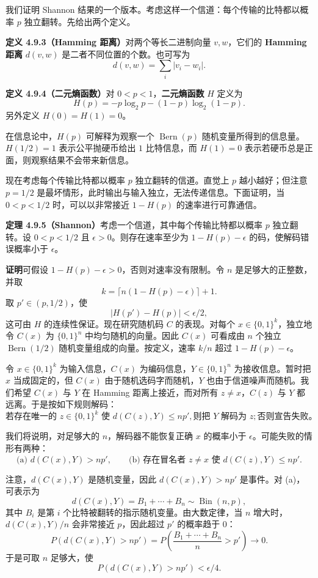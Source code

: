 \documentclass[UTF8,12pt,a4paper,fontset=fandol]{ctexart}
\begin{document}
我们证明 Shannon 结果的一个版本。考虑这样一个信道：每个传输的比特都以概率 $p$ 独立翻转。先给出两个定义。

\noindent\textbf{定义 4.9.3（Hamming 距离）}\quad 对两个等长二进制向量 $v,w$，它们的 \textbf{Hamming 距离} $d(v,w)$ 是二者不同位置的个数。也可写为
\[
  d(v,w)=\sum_i |v_i-w_i|.
\]

\noindent\textbf{定义 4.9.4（二元熵函数）}\quad 对 $0<p<1$，\textbf{二元熵函数} $H$ 定义为
\[
  H(p)=-p\log_2p-(1-p)\log_2(1-p).
\]
另外定义 $H(0)=H(1)=0$。

在信息论中，$H(p)$ 可解释为观察一个 $\operatorname{Bern}(p)$ 随机变量所得到的信息量。$H(1/2)=1$ 表示公平抛硬币给出 $1$ 比特信息，而 $H(1)=0$ 表示若硬币总是正面，则观察结果不会带来新信息。

现在考虑每个传输比特都以概率 $p$ 独立翻转的信道。直觉上 $p$ 越小越好；但注意 $p=1/2$ 是最坏情形，此时输出与输入独立，无法传递信息。下面证明，当 $0<p<1/2$ 时，可以以非常接近 $1-H(p)$ 的速率进行可靠通信。

\noindent\textbf{定理 4.9.5（Shannon）}\quad 考虑一个信道，其中每个传输比特都以概率 $p$ 独立翻转。设 $0<p<1/2$ 且 $\epsilon>0$。则存在速率至少为 $1-H(p)-\epsilon$ 的码，使解码错误概率小于 $\epsilon$。

\noindent\textbf{证明}\quad 可假设 $1-H(p)-\epsilon>0$，否则对速率没有限制。令 $n$ 是足够大的正整数，并取
\[
  k=\lceil n(1-H(p)-\epsilon)\rceil+1.
\]
取 $p'\in(p,1/2)$，使
\[
  |H(p')-H(p)|<\epsilon/2,
\]
这可由 $H$ 的连续性保证。现在研究随机码 $C$ 的表现。对每个 $x\in\{0,1\}^k$，独立地令 $C(x)$ 为 $\{0,1\}^n$ 中均匀随机的向量。因此 $C(x)$ 可看成由 $n$ 个独立 $\operatorname{Bern}(1/2)$ 随机变量组成的向量。按定义，速率 $k/n$ 超过 $1-H(p)-\epsilon$。

令 $x\in\{0,1\}^k$ 为输入信息，$C(x)$ 为编码信息，$Y\in\{0,1\}^n$ 为接收信息。暂时把 $x$ 当成固定的，但 $C(x)$ 由于随机选码字而随机，$Y$ 也由于信道噪声而随机。我们希望 $C(x)$ 与 $Y$ 在 Hamming 距离上接近，而对所有 $z\ne x$，$C(z)$ 与 $Y$ 都远离。于是按如下规则解码：
\[
  \text{若存在唯一的 }z\in\{0,1\}^k\text{ 使 }d(C(z),Y)\le np',
  \text{则把 }Y\text{ 解码为 }z;\text{否则宣告失败。}
\]

我们将说明，对足够大的 $n$，解码器不能恢复正确 $x$ 的概率小于 $\epsilon$。可能失败的情形有两种：
\[
  \text{(a) }d(C(x),Y)>np',
  \qquad
  \text{(b) 存在冒名者 }z\ne x\text{ 使 }d(C(z),Y)\le np'.
\]

注意，$d(C(x),Y)$ 是随机变量，因此 $d(C(x),Y)>np'$ 是事件。对 (a)，可表示为
\[
  d(C(x),Y)=B_1+\cdots+B_n\sim\operatorname{Bin}(n,p),
\]
其中 $B_i$ 是第 $i$ 个比特被翻转的指示随机变量。由大数定律，当 $n$ 增大时，$d(C(x),Y)/n$ 会非常接近 $p$，因此超过 $p'$ 的概率趋于 $0$：
\[
  P(d(C(x),Y)>np')
  =P\left(\frac{B_1+\cdots+B_n}{n}>p'\right)\to 0.
\]
于是可取 $n$ 足够大，使
\[
  P(d(C(x),Y)>np')<\epsilon/4.
\]
\end{document}

